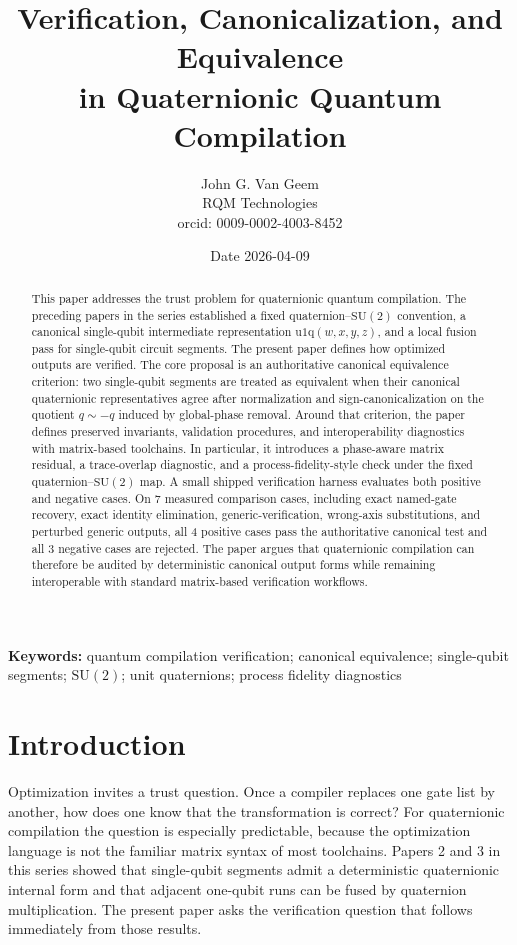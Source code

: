 \documentclass[11pt]{article}
\title{\textbf{Verification, Canonicalization, and Equivalence}\\
in Quaternionic Quantum Compilation}
\author{John G. Van Geem\\
RQM Technologies\\
orcid: 0009-0002-4003-8452}
\date{Date 2026-04-09}
\theoremstyle{remark}
\newcommand{\SU}{\mathrm{SU}}
\newcommand{\uoneq}{\mathrm{u1q}}
\begin{document}
\maketitle

\begin{abstract}
This paper addresses the trust problem for quaternionic quantum compilation. The
preceding papers in the series established a fixed quaternion--$\SU(2)$
convention, a canonical single-qubit intermediate representation
$\uoneq(w,x,y,z)$, and a local fusion pass for single-qubit circuit segments.
The present paper defines how optimized outputs are verified. The core proposal
is an authoritative canonical equivalence criterion: two single-qubit segments
are treated as equivalent when their canonical quaternionic representatives agree
after normalization and sign-canonicalization on the quotient $q\sim -q$
induced by global-phase removal. Around that criterion, the paper defines
preserved invariants, validation procedures, and interoperability diagnostics
with matrix-based toolchains. In particular, it introduces a phase-aware
matrix residual, a trace-overlap diagnostic, and a process-fidelity-style
check under the fixed quaternion--$\SU(2)$ map. A small shipped verification
harness evaluates both positive and negative cases. On 7 measured comparison
cases, including exact named-gate recovery, exact identity elimination,
generic-\uoneq verification, wrong-axis substitutions, and perturbed generic
outputs, all 4 positive cases pass the authoritative canonical test and all
3 negative cases are rejected. The paper argues that quaternionic compilation
can therefore be audited by deterministic canonical output forms while remaining
interoperable with standard matrix-based verification workflows.
\end{abstract}

\noindent\textbf{Keywords:} quantum compilation verification; canonical equivalence; single-qubit segments; $\SU(2)$; unit quaternions; process fidelity diagnostics

\section{Introduction}

Optimization invites a trust question. Once a compiler replaces one gate list by
another, how does one know that the transformation is correct? For quaternionic
compilation the question is especially predictable, because the optimization
language is not the familiar matrix syntax of most toolchains. Papers 2 and 3
in this series showed that single-qubit segments admit a deterministic
quaternionic internal form and that adjacent one-qubit runs can be fused by
quaternion multiplication. The present paper asks the verification question that
follows immediately from those results.
\end{document}
